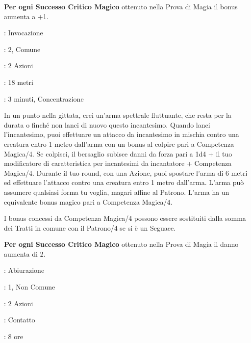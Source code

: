 \begin{multicols}{2}
\textbf{Per ogni Successo Critico Magico} ottenuto nella Prova di Magia il bonus aumenta a +1.

\noindent\colorbox{OBSSgold!10}{
\begin{minipage}{0.95\linewidth}
\begin{description}[noitemsep, topsep=0pt, parsep=0pt, partopsep=0pt, leftmargin=0cm, labelwidth=1.3cm]
	\item[\textbf{Lista}]: Invocazione
	\item[\textbf{Livello}]: 2, Comune
	\item[\textbf{Lancio}]: 2 Azioni
	\item[\textbf{Gittata}]: 18 metri
	\item[\textbf{Durata}]: 3 minuti, Concentrazione
\end{description}
\end{minipage}}\smallskip

In un punto nella gittata, crei un'arma spettrale fluttuante, che resta per la durata o finché non lanci di nuovo questo incantesimo. Quando lanci l'incantesimo, puoi effettuare un attacco da incantesimo in mischia contro una creatura entro 1 metro dall'arma con un bonus al colpire pari a Competenza Magica/4. Se colpisci, il bersaglio subisce danni da forza pari a 1d4 + il tuo modificatore di caratteristica per incantesimi da incantatore + Competenza Magica/4. Durante il tuo round, con una Azione, puoi spostare l'arma di 6 metri ed effettuare l'attacco contro una creatura entro 1 metro dall'arma. L'arma può assumere qualsiasi forma tu voglia, magari affine al Patrono. L'arma ha un equivalente bonus magico pari a Competenza Magica/4.

I bonus concessi da Competenza Magica/4 possono essere sostituiti dalla somma dei Tratti in comune con il Patrono/4 se si è un Seguace.

\textbf{Per ogni Successo Critico Magico} ottenuto nella Prova di Magia il danno aumenta di 2.

\noindent\colorbox{OBSSgold!10}{
\begin{minipage}{0.95\linewidth}
\begin{description}[noitemsep, topsep=0pt, parsep=0pt, partopsep=0pt, leftmargin=0cm, labelwidth=1.3cm]
	\item[\textbf{Lista}]: Abiurazione
	\item[\textbf{Livello}]: 1, Non Comune
	\item[\textbf{Lancio}]: 2 Azioni
	\item[\textbf{Gittata}]: Contatto
	\item[\textbf{Durata}]: 8 ore
\end{description}
\end{minipage}}\smallskip


\end{multicols}
